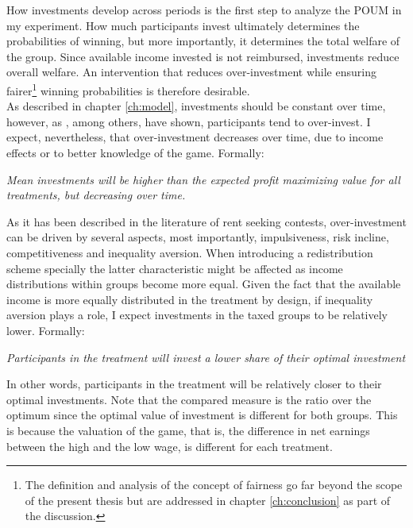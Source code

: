     How investments develop across periods is the first step to analyze the POUM in my experiment. How much participants invest ultimately determines the probabilities of winning, but more importantly, it determines the total welfare of the group. Since available income invested is not reimbursed, investments reduce overall welfare. An intervention that reduces over-investment while ensuring fairer\footnote{The definition and analysis of the concept of fairness go far beyond the scope of the present thesis but are addressed in chapter \ref{ch:conclusion} as part of the discussion.} winning probabilities is therefore desirable.\\
    
    As described in chapter \ref{ch:model}, investments should be constant over time, however, as \cite{sheremeta2016}, among others, have shown, participants tend to over-invest. I expect, nevertheless, that over-investment decreases over time, due to income effects or to better knowledge of the game. Formally:\\
    
     \begin{hyp} \label{hyp:treat}\textit{Mean investments will be higher than the expected profit maximizing value for all treatments, but decreasing over time.}\end{hyp}
    
    As it has been described in the literature of rent seeking contests, over-investment can be driven by several aspects, most importantly, impulsiveness, risk incline, competitiveness and inequality aversion. When introducing a redistribution scheme specially the latter characteristic might be affected as income distributions within groups become more equal. Given the fact that the available income is more equally distributed in the treatment by design, if inequality aversion plays a role, I expect investments in the taxed groups to be relatively lower. Formally:\\
    
    \begin{hyp} \label{hyp:treat-overinvest}
    \textit{Participants in the treatment will invest a lower share of their optimal investment}
    \end{hyp}
    
    In other words, participants in the treatment will be relatively closer to their optimal investments. Note that the compared measure is the ratio over the optimum since the optimal value of investment is different for both groups. This is because the valuation of the game, that is, the difference in net earnings between the high and the low wage, is different for each treatment.\\ 
    

